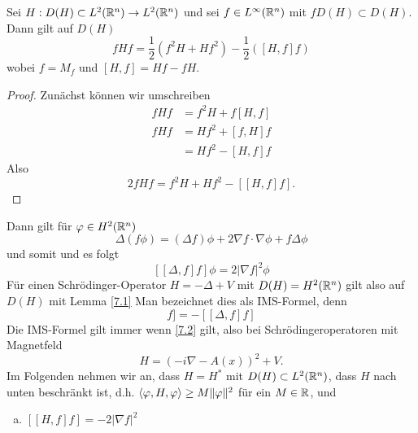 \documentclass{mycourse}
\begin{document}
\begin{lem}\label{7.1}
Sei $H:D(H) \subset L^2(\mathbb{R}^n) \to L^2(\mathbb{R}^n)$ und sei $f\in L^\infty(\mathbb{R}^n)$ mit $fD(H)\subset D(H)$. Dann gilt auf $D(H)$
\[
fHf= \frac{1}{2} (f^2H +Hf^2) - \frac{1}{2} ([H,f]f)
\]
wobei $f= M_f$ und $[H,f] = Hf-fH$. 
\end{lem}
\begin{proof}
Zunächst können wir umschreiben \fixme
\begin{align*}
fHf &= f^2 H + f[H,f] \\
fHf &= Hf^2 + [f,H] f \\
&= Hf^2 - [H,f]f
\end{align*}
Also
\[
2 fHf = f^2 H + Hf^2 - [ [H,f]f].
\]
\end{proof}
Dann gilt für $\varphi \in H^2(\mathbb{R}^n)$
\[
\Delta(f\phi) = (\Delta f) \phi + 2\nabla f \cdot \nabla \phi + f\Delta \phi
\]
und somit
und es folgt 
\[
[[\Delta,f] f] \phi = 2|\nabla f|^2 \phi
\]
Für einen Schrödinger-Operator $H=-\Delta + V$ mit $D(H)=H^2(\mathbb{R}^n)$ gilt also auf $D(H)$ mit Lemma \ref{7.1}
Man bezeichnet dies als IMS-Formel, denn
\begin{equation} 
[[H,f]f] = -[[\Delta,f] f] \label{7.2}
\end{equation}
Die IMS-Formel gilt immer wenn \eqref{7.2} gilt, also bei Schrödingeroperatoren mit Magnetfeld
\[
H=(-i\nabla -A(x))^2 + V.
\]
Im Folgenden nehmen wir an, dass $H=H^*$ mit $D(H)\subset L^2(\mathbb{R}^n)$, dass $H$ nach unten beschränkt ist, d.h. $\langle \varphi, H, \varphi\rangle\ge M \| \varphi \|^2$ für ein $M\in \mathbb{R}$, und
\begin{enumerate}[a)]
\item $[[H,f]f] = -2|\nabla f|^2$
\end{enumerate}
\end{document}
